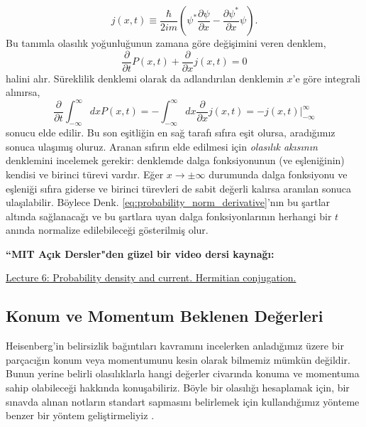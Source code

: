\documentclass[00_kitap.tex]{subfiles}
\begin{document}
\begin{equation}
j(x,t)\equiv \dfrac {\hbar }{2im}\left( \psi ^{\ast }\dfrac {\partial \psi }{\partial x}-\dfrac {\partial \psi ^{\ast }}{\partial x}\psi \right).
\label{eq:probability_current}
\end{equation}
Bu tanımla olasılık yoğunluğunun zamana göre değişimini veren denklem,
\begin{equation}
\dfrac {\partial }{\partial t}P\left( x,t\right) +\dfrac {\partial }{\partial x}j\left( x,t\right) =0
\label{eq:continuity_equation}
\end{equation}
halini alır. Süreklilik denklemi olarak da adlandırılan denklemin $x$'e göre integrali alınırsa,
\begin{equation}
\dfrac {\partial }{\partial t}\int ^{\infty }_{-\infty }dxP\left( x,t\right) =-\int ^{\infty }_{-\infty }dx\dfrac {\partial }{\partial x}j\left( x,t\right) = -j(x,t)\bigg|^{\infty}_{-\infty}
\end{equation}
sonucu elde edilir. Bu son eşitliğin en sağ tarafı sıfıra eşit olursa, aradığımız sonuca ulaşımış oluruz. Aranan sıfırın elde edilmesi için \emph{olasılık akısının} denklemini incelemek gerekir: denklemde dalga fonksiyonunun (ve eşleniğinin) kendisi ve birinci türevi vardır. Eğer $x\rightarrow\pm\infty$ durumunda dalga fonksiyonu ve eşleniği sıfıra giderse ve birinci türevleri de sabit değerli kalırsa aranılan sonuca ulaşılabilir. Böylece Denk. \ref{eq:probability_norm_derivative}'nın bu şartlar altında sağlanacağı ve bu şartlara uyan dalga fonksiyonlarının herhangi bir $t$ anında normalize edilebileceği gösterilmiş olur. 

\vspace{18pt}
{\bf ``MIT Açık Dersler"den güzel bir video dersi kaynağı:}

\href{https://ocw.mit.edu/courses/physics/8-04-quantum-physics-i-spring-2016/video-lectures/part-1/}{Lecture 6: Probability density and current. Hermitian conjugation.}


\subsection{Konum ve Momentum Beklenen Değerleri}

Heisenberg'in belirsizlik bağıntıları kavramını incelerken anladığımız üzere bir parçacığın konum veya momentumunu kesin olarak bilmemiz mümkün değildir. Bunun yerine belirli olasılıklarla hangi değerler civarında konuma ve momentuma sahip olabileceği hakkında konuşabiliriz. Böyle bir olasılığı hesaplamak için, bir sınavda alınan notların standart sapmasını belirlemek için kullandığımız yönteme benzer bir yöntem geliştirmeliyiz \cite{book:Towsend}.
\end{document}
